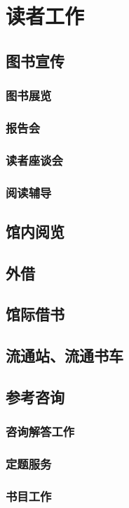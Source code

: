 \documentclass[UTF8]{../../ApplicationUniverse}
\begin{document}
\section{读者工作}
    \subsection{图书宣传}
        \subsubsection{图书展览}
        \subsubsection{报告会}
        \subsubsection{读者座谈会}
        \subsubsection{阅读辅导}
    \subsection{馆内阅览}
    \subsection{外借}
    \subsection{馆际借书}
    \subsection{流通站、流通书车}
    \subsection{参考咨询}
        \subsubsection{咨询解答工作}
        \subsubsection{定题服务}
        \subsubsection{书目工作}
\end{document}
